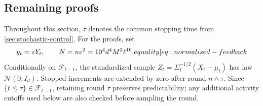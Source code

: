 \documentclass[12pt,cleveref]{jmlr}
\newcommand{\eqlabel}[1]{\label[equality]{#1}}
\newcommand{\F}{\mathcal F}
\newcommand{\N}{\mathcal N}
\newcommand{\1}{\mathbf 1}
\newcommand{\eps}{\varepsilon}
\begin{document}
\subsection{Remaining proofs}
Throughout this section, $\tau$ denotes the common stopping time from
\cref{sec:stochastic-control}. For the proofs, set
\begin{align}
    y_t=\eps Y_t,
    \qquad N=n\eps^2=10^4d^4M^2\ell^{16}.
    \eqlabel{eq:normalised-feedback}
\end{align}
Conditionally on $\F_{t-1}$, the standardized sample
$Z_t=\Sigma_t^{-1/2}(X_t-\mu_t)$ has law $\N(0,I_d)$.
Stopped increments are extended by zero after round $n\wedge\tau$.
Since $\{t\leq\tau\}\in\F_{t-1}$, retaining round $\tau$ preserves
predictability; any additional activity cutoffs used below are also checked
before sampling the round.
\end{document}
